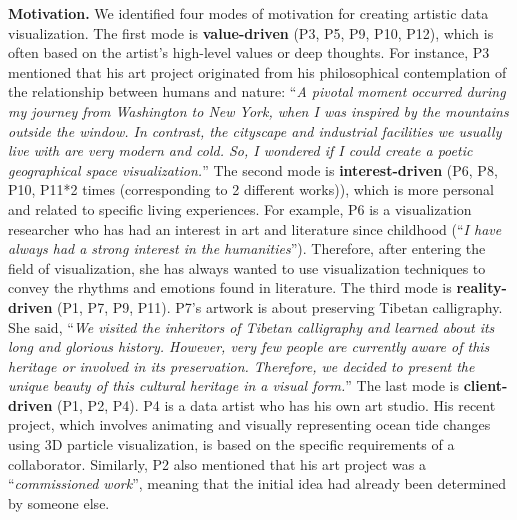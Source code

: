 \textbf{Motivation.}
We identified four modes of motivation for creating artistic data visualization. 
The first mode is \textbf{value-driven} (P3, P5, P9, P10, P12), which is often based on the artist's high-level values or deep thoughts. For instance, P3 mentioned that his art project originated from his philosophical contemplation of the relationship between humans and nature: ``\textit{A pivotal moment occurred during my journey from Washington to New York, when I was inspired by the mountains outside the window. In contrast, the cityscape and industrial facilities we usually live with are very modern and cold. So, I wondered if I could create a poetic geographical space visualization.}''
The second mode is \textbf{interest-driven} (P6, P8, P10, P11*2 times (corresponding to 2 different works)), which is more personal and related to specific living experiences. For example, P6 is a visualization researcher who has had an interest in art and literature since childhood (``\textit{I have always had a strong interest in the humanities}''). Therefore, after entering the field of visualization, she has always wanted to use visualization techniques to convey the rhythms and emotions found in literature.
The third mode is \textbf{reality-driven} (P1, P7, P9, P11). P7's artwork is about preserving Tibetan calligraphy. She said, ``\textit{We visited the inheritors of Tibetan calligraphy and learned about its long and glorious history. However, very few people are currently aware of this heritage or involved in its preservation. Therefore, we decided to present the unique beauty of this cultural heritage in a visual form.}''
The last mode is \textbf{client-driven} (P1, P2, P4). P4 is a data artist who has his own art studio. His recent project, which involves animating and visually representing ocean tide changes using 3D particle visualization, is based on the specific requirements of a collaborator. Similarly, P2 also mentioned that his art project was a ``\textit{commissioned work}'', meaning that the initial idea had already been determined by someone else.

